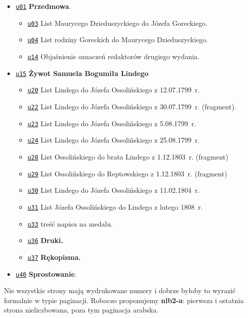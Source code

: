 \documentclass[12]{mwart}
\begin{document}
\begin{itemize}
\item \href{\pai{1}{07}}{\texttt{u01}}  \textbf{Przedmowa}.
  \begin{itemize}
  \item \href{\pai{1}{09}}{\texttt{u03}} List Maurycego Dzieduszyckiego do Józefa Goreckiego.
  \item \href{\pai{1}{10}}{\texttt{u04}} List rodziny Goreckich do Maurycego Dzieduszyckiego.
  \item \href{\pai{1}{20}}{\texttt{u14}} Objaśnienie oznaczeń redaktorów drugiego wydania.
  \end{itemize}
\item \href{\pai{1}{21}}{\texttt{u15}}  \textbf{Żywot Samuela Bogumiła Lindego}
  \begin{itemize}
  \item \href{\pai{1}{26}}{\texttt{u20}} List Lindego do Józefa Ossolińskiego z 12.07.1799~r.
  \item \href{\pai{1}{28}}{\texttt{u22}} List Lindego do Józefa Ossolińskiego z 30.07.1799~r. (fragment).
  \item \href{\pai{1}{29}}{\texttt{u23}} List Lindego do Józefa Ossolińskiego z 5.08.1799~r.
  \item \href{\pai{1}{30}}{\texttt{u24}} List Lindego do Józefa Ossolińskiego z 25.08.1799~r.
  \item \href{\pai{1}{34}}{\texttt{u28}} List Ossolińskiego do brata
    Lindego z 1.12.1803~r. (fragment)
  \item \href{\pai{1}{35}}{\texttt{u29}} List Ossolińskiego do
    Reptowskiego z 1.12.1803~r. (fragment)
  \item \href{\pai{1}{36}}{\texttt{u30}} List Lindego do Józefa
    Ossolińskiego z 11.02.1804~r.
  \item \href{\pai{1}{37}}{\texttt{u31}} List Józefa Ossolińskiego do
    Lindego z lutego 1808~r.
  \item \href{\pai{1}{39}}{\texttt{u33}} treść napisu na medalu.
  \item \href{\pai{1}{42}}{\texttt{u36}} \textbf{Druki.}
  \item \href{\pai{1}{43}}{\texttt{u37}} \textbf{Rękopisma.}
  \end{itemize}
\item \href{\pai{1}{46}}{\texttt{u40}}  \textbf{Sprostowanie}.
\end{itemize}

Nie wszystkie strony mają wydrukowane numery i dobrze byłoby to
wyrazić formalnie w typie paginacji. Roboczo proponujemy
\textbf{nlb2-a}: pierwsza i ostatnia strona nieliczbowana, poza tym
paginacja arabska.
\end{document}
